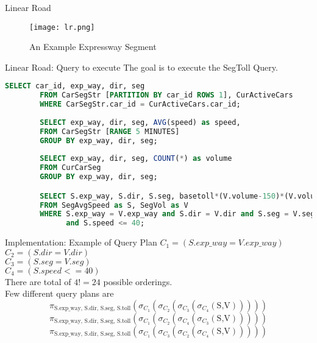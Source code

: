 \begin{frame}{Linear Road}
    \begin{figure}
        \centering
        \texttt{[image: lr.png]}\\
        \caption{An Example Expressway Segment}
        \label{fig:lr_ex}
    \end{figure}
\end{frame}

\begin{frame}[fragile]{Linear Road: Query to execute}
    The goal is to execute the SegToll Query.
    \begin{lstlisting}[language=SQL, caption= SEGTOLL linear road query]
        SELECT car_id, exp_way, dir, seg
        FROM CarSegStr [PARTITION BY car_id ROWS 1], CurActiveCars
        WHERE CarSegStr.car_id = CurActiveCars.car_id;
        
        SELECT exp_way, dir, seg, AVG(speed) as speed,
        FROM CarSegStr [RANGE 5 MINUTES]
        GROUP BY exp_way, dir, seg;
        
        SELECT exp_way, dir, seg, COUNT(*) as volume
        FROM CurCarSeg
        GROUP BY exp_way, dir, seg;

        SELECT S.exp_way, S.dir, S.seg, basetoll*(V.volume-150)*(V.volume-150)
        FROM SegAvgSpeed as S, SegVol as V
        WHERE S.exp_way = V.exp_way and S.dir = V.dir and S.seg = V.seg
              and S.speed <= 40;
    \end{lstlisting}
\end{frame}

\begin{frame}{Implementation: Example of Query Plan}
$C_1=(S.exp\_way = V.exp\_way)$\\
$C_2=(S.dir = V.dir)$\\
$C_3=(S.seg = V.seg)$\\
$C_4=(S.speed <= 40)$\\
There are total of $4!=24$ possible orderings.\\
Few different query plans are
$$\pi_{\text{S.exp\_way, S.dir, S.seg, S.toll}}(\sigma_{C_1}(\sigma_{C_2}(\sigma_{C_3}(\sigma_{C_4}(\text{S,V})))))$$
$$\pi_{\text{S.exp\_way, S.dir, S.seg, S.toll}}(\sigma_{C_1}(\sigma_{C_2}(\sigma_{C_4}(\sigma_{C_3}(\text{S,V})))))$$
$$\pi_{\text{S.exp\_way, S.dir, S.seg, S.toll}}(\sigma_{C_1}(\sigma_{C_3}(\sigma_{C_2}(\sigma_{C_4}(\text{S,V})))))$$

\end{frame}

